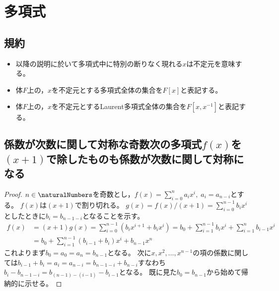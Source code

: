 \chapter{多項式}
    \section{規約}
        \begin{itemize}
            \item 以降の説明に於いて多項式中に特別の断りなく現れる$x$は不定元を意味する。
            \item 体$F$上の，$x$を不定元とする多項式全体の集合を$F[x]$と表記する。
            \item 体$F$上の，$x$を不定元とするLaurent多項式全体の集合を$F[x,x^{-1}]$と表記する。
        \end{itemize}
    \section{係数が次数に関して対称な奇数次の多項式\texorpdfstring{$f(x)$}{f(x)}を\texorpdfstring{$(x+1)$}{x+1}で除したものも係数が次数に関して対称になる}
        \begin{proof}
            \quad\par
            $n\in\naturalNumbers$を奇数とし，$f(x) = \sum_{i=0}^n a_ix^i,\;a_i = a_{n-i}$とする。
            $f(x)$は$(x+1)$で割り切れる。
            $g(x) = f(x)/(x+1) = \sum_{i=0}^{n-1} b_ix^i$としたときに$b_i = b_{n-1-i}$となることを示す。
            \begin{align*}
                f(x) &= (x+1)g(x) = \sum_{i=0}^{n-1} (b_ix^{i+1} + b_ix^i) = b_0 + \sum_{i=1}^{n-1}b_ix^i + \sum_{i=1}^n b_{i-1}x^i \\
                &= b_0 + \sum_{i=1}^{n-1} (b_{i-1} + b_i)x^i + b_{n-1}x^n
            \end{align*}
            これよりまず$b_0 = a_0 = a_n = b_{n-1}$となる。
            次に$x,x^2,\dotsc,x^{n-1}$の項の係数に関しては$b_{i-1} + b_i = a_i = a_{n-i} = b_{n-1-i} + b_{n-i}$すなわち$b_i - b_{n-1-i} = b_{(n-1)-(i-1)} - b_{i-1}$となる。
            既に見た$b_0 = b_{n-1}$から始めて帰納的に示せる。
        \end{proof}
